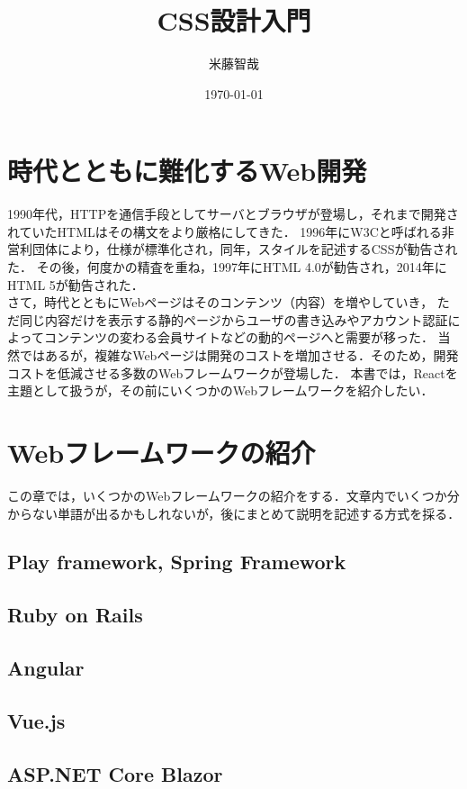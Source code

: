 \documentclass[11pt,a4paper]{jsarticle}
\title{CSS設計入門}
\author{米藤智哉}
\date{\today}
\begin{document}
\maketitle
%
%
\section{時代とともに難化するWeb開発}
1990年代，HTTPを通信手段としてサーバとブラウザが登場し，それまで開発されていたHTMLはその構文をより厳格にしてきた．
1996年にW3Cと呼ばれる非営利団体により，仕様が標準化され，同年，スタイルを記述するCSSが勧告された．
その後，何度かの精査を重ね，1997年にHTML 4.0が勧告され，2014年にHTML 5が勧告された．\\
さて，時代とともにWebページはそのコンテンツ（内容）を増やしていき，
ただ同じ内容だけを表示する静的ページからユーザの書き込みやアカウント認証によってコンテンツの変わる会員サイトなどの動的ページへと需要が移った．
当然ではあるが，複雑なWebページは開発のコストを増加させる．そのため，開発コストを低減させる多数のWebフレームワークが登場した．
本書では，Reactを主題として扱うが，その前にいくつかのWebフレームワークを紹介したい．

\section{Webフレームワークの紹介}
この章では，いくつかのWebフレームワークの紹介をする．文章内でいくつか分からない単語が出るかもしれないが，後にまとめて説明を記述する方式を採る．

\subsection{Play framework, Spring Framework}

\subsection{Ruby on Rails}
\subsection{Angular}
\subsection{Vue.js}
\subsection{ASP.NET Core Blazor}
\end{document}
